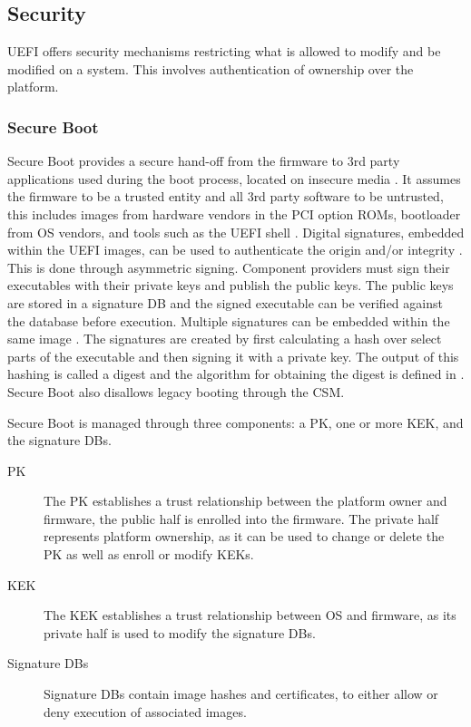 
\subsection{Security}

\ac{UEFI} offers security mechanisms restricting what is allowed to modify and be modified on a system.
This involves authentication of ownership over the platform.

\subsubsection{Secure Boot}
\label{sec:uefi-pi:uefi:secure-boot}

Secure Boot provides a secure hand-off from the firmware to 3rd party applications used during the boot process, located on insecure media \cite{tianocore-understanding-uefi-secure-boot-chain} \cite[Sections 32.2 and 32.5.1]{uefi-spec}.
It assumes the firmware to be a trusted entity and all 3rd party software to be untrusted, this includes images from hardware vendors in the \ac{PCI} option \acp{ROM}, bootloader from \ac{OS} vendors, and tools such as the \ac{UEFI} shell \cite{tianocore-understanding-uefi-secure-boot-chain}.
Digital signatures, embedded within the \ac{UEFI} images, can be used to authenticate the origin and/or integrity \cite[Section 32.2]{uefi-spec}.
This is done through asymmetric signing.
Component providers must sign their executables with their private keys and publish the public keys.
The public keys are stored in a signature \ac{DB} and the signed executable can be verified against the database before execution.
Multiple signatures can be embedded within the same image \cite[Section 32.2.2]{uefi-spec}.
The signatures are created by first calculating a hash over select parts of the executable and then signing it with a private key.
The output of this hashing is called a digest and the algorithm for obtaining the digest is defined in \cite{microsoft-pe-signature-format}.
Secure Boot also disallows legacy booting through the \ac{CSM}.

Secure Boot is managed through three components: a \ac{PK}, one or more \ac{KEK}, and the signature \acp{DB}.

\begin{description}
    \item[\acl{PK}]
        The \ac{PK} establishes a trust relationship between the platform owner and firmware, the public half is enrolled into the firmware.
        The private half represents platform ownership, as it can be used to change or delete the \ac{PK} as well as enroll or modify \acp{KEK}.
    \item[\acl{KEK}]
        The \ac{KEK} establishes a trust relationship between \ac{OS} and firmware, as its private half is used to modify the signature \acfp{DB}.
    \item[Signature \aclp{DB}]
        Signature \acp{DB} contain image hashes and certificates, to either allow or deny execution of associated images.
\end{description}

